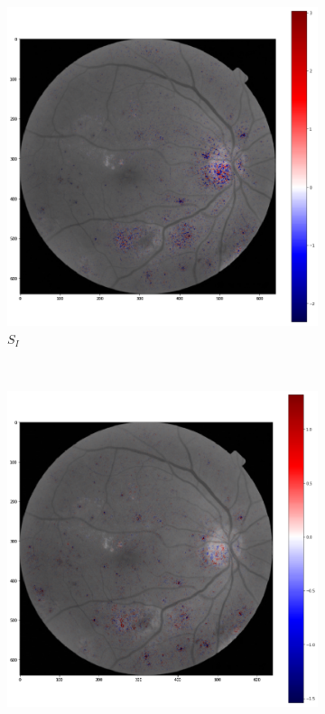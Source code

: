 \documentclass[review]{elsarticle}
\theoremstyle{definition} %
\theoremstyle{remark}
\begin{document}
\begin{figure}[!ht]
	\centering
	\begin{subfigure}{0.45\textwidth}
		\includegraphics[width=\textwidth]{./figures/maps/inp.png}
		\caption{$S_I$}
		\label{fig:score_input}
	\end{subfigure}
	~ %
	\begin{subfigure}{0.45\textwidth}
		\includegraphics[width=\textwidth]{./figures/maps/kmap.png}

\end{subfigure}
\end{figure}
\end{document}
